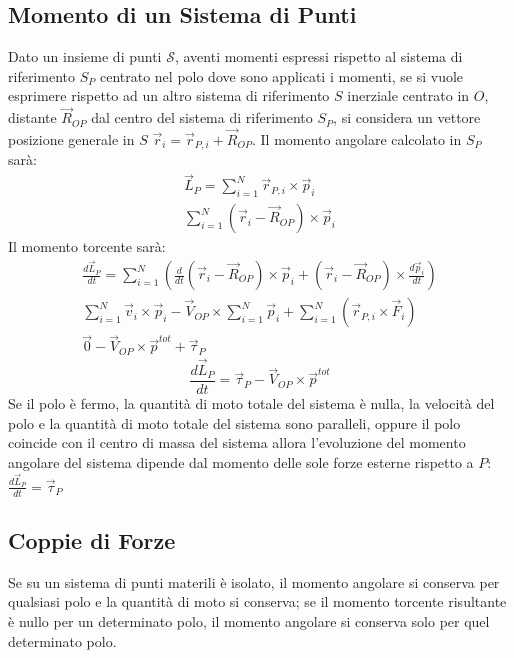 \documentclass{article}
\numberwithin{equation}{subsection}
\begin{document}
\subsection{Momento di un Sistema di Punti}
Dato un insieme di punti $\mathscr{S}$, aventi momenti espressi 
rispetto al sistema di riferimento $S_P$ centrato 
nel polo dove sono applicati i momenti, se si vuole 
esprimere rispetto ad un altro sistema di riferimento $S$ 
inerziale centrato in $O$, distante $\vec{R}_{OP}$ dal centro 
del sistema di riferimento $S_P$, si considera un vettore 
posizione generale in $S$ $\vec{r}_i=\vec{r}_{P,i}+\vec{R}_{OP}$.
Il momento angolare calcolato in $S_P$ sarà:
\begin{gather*}
    \vec{L}_P=\displaystyle\sum_{i=1}^{N}\vec{r}_{P,i}\times\vec{p}_i\\
    \displaystyle\sum_{i=1}^{N}(\vec{r}_i-\vec{R}_{OP})\times\vec{p}_i
\end{gather*}
Il momento torcente sarà:
\begin{gather*}
    \displaystyle\frac{d\vec{L}_P}{dt}=\sum_{i=1}^{N}\left(\frac{d}{dt}(\vec{r}_i-\vec{R}_{OP})\times\vec{p}_i+(\vec{r}_i-\vec{R}_{OP})\times\frac{d\vec{p}_i}{dt}\right)\\
    \displaystyle\sum_{i=1}^{N}\vec{v}_i\times\vec{p}_i-\vec{V}_{OP}\times\sum_{i=1}^{N}\vec{p}_i+\sum_{i=1}^{N}(\vec{r}_{P,i}\times\vec{F}_i)\\
    \vec{0}-\vec{V}_{OP}\times\vec{p}^{tot}+\vec{\tau}_P
\end{gather*}
\begin{equation}
    \displaystyle\frac{d\vec{L}_P}{dt}=\vec{\tau}_P-\vec{V}_{OP}\times\vec{p}^{tot}
\end{equation}
Se il polo è fermo, la quantità di moto totale del sistema è 
nulla, la velocità del polo e la quantità di moto 
totale del sistema sono paralleli, oppure il polo coincide con 
il centro di massa del sistema allora l'evoluzione del momento angolare del sistema dipende dal momento delle sole forze esterne rispetto a $P$: 
$\displaystyle\frac{d\vec{L}_P}{dt}=\vec{\tau}_P$

\subsection{Coppie di Forze}
Se su un sistema di punti materili è isolato, il momento angolare si conserva per qualsiasi polo e la quantità di moto si conserva; se il momento torcente risultante è nullo per un determinato polo, il momento 
angolare si conserva solo per quel determinato polo. 
\end{document}
